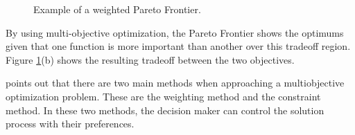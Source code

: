 \begin{figure}%
    \centering
    \qquad
    \caption{Example of a weighted Pareto Frontier.}%
    \label{visualex}
\end{figure}

By using multi-objective optimization, the Pareto Frontier shows the optimums given that one function is more important than another over this tradeoff region. Figure \ref{visualex}(b) shows the resulting tradeoff between the two objectives.


\par
\cite{MultOptCS} points out that there are two main methods when approaching a multiobjective optimization problem. These are the weighting method and the constraint method. In these two methods, the decision maker can control the solution process with their preferences.\par
